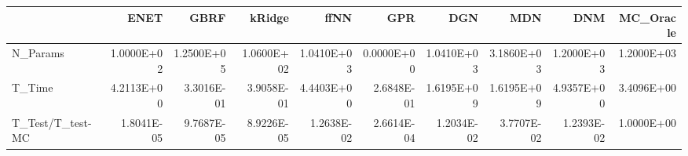 \begin{tabular}{lrrrrrrrrr}
\toprule
{} &       ENET &       GBRF &     kRidge &       ffNN &        GPR &        DGN &        MDN &        DNM &  MC\_Oracle \\
\midrule
N\_Params         & 1.0000E+02 & 1.2500E+05 & 1.0600E+02 & 1.0410E+03 & 0.0000E+00 & 1.0410E+03 & 3.1860E+03 & 1.2000E+03 & 1.2000E+03 \\
T\_Time           & 4.2113E+00 & 3.3016E-01 & 3.9058E-01 & 4.4403E+00 & 2.6848E-01 & 1.6195E+09 & 1.6195E+09 & 4.9357E+00 & 3.4096E+00 \\
T\_Test/T\_test-MC & 1.8041E-05 & 9.7687E-05 & 8.9226E-05 & 1.2638E-02 & 2.6614E-04 & 1.2034E-02 & 3.7707E-02 & 1.2393E-02 & 1.0000E+00 \\
\bottomrule
\end{tabular}

